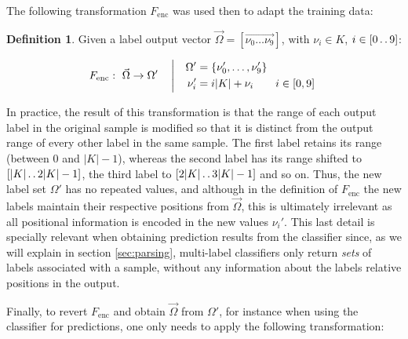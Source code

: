 \documentclass{kthreport}
\theoremstyle{definition}
\newtheorem{definition}{Definition}
\newcommand{\twodots}{\mathinner {\ldotp \ldotp}}
\begin{document}
The following transformation $F_{\text{enc}}$ was used then to adapt the training data:

\begin{definition}
     Given a label output vector $\vec{\Omega} = [\vec{\nu_{0} \dots \nu_{9}}]$, with $\nu_{i} \in K$, $i \in [0 \twodots 9]$:
    
    \begin{equation}\label{ec:fenc}
    F_{\text{enc}}:\ \vec{\Omega} \rightarrow \Omega' \quad \left\vert \quad
    \begin{aligned}
    \Omega' &= \{\nu'_{0}, \ldots, \nu'_{9}\} \\
    \nu'_{i} &= i|K| + \nu_{i} \qquad i \in [0, 9]
    \end{aligned}\right.\\
    \end{equation}
\end{definition}


In practice, the result of this transformation is that the range of each output label in the original sample is modified so that it is distinct from the output range of every other label in the same sample. 
The first label retains its range (between \num{0} and $|K| - 1$), whereas the second label has its range shifted to $[|K|\twodots2|K| - 1]$, the third label to $[2|K|\twodots3|K| - 1]$ and so on.
Thus, the new label set $\Omega'$ has no repeated values, and although in the definition of $F_{\text{enc}}$ the new labels maintain their respective positions from $\vec{\Omega}$, this is ultimately irrelevant as all positional information is encoded in the new values $\nu_{i}'$. 
This last detail is specially relevant when obtaining prediction results from the classifier since, as we will explain in section \ref{sec:parsing}, multi-label classifiers only return \emph{sets} of labels associated with a sample, without any information about the labels relative positions in the output.

Finally, to revert $F_{\text{enc}}$ and obtain $\vec{\Omega}$ from $\Omega'$, for instance when using the classifier for predictions, one only needs to apply the following transformation:
\end{document}
